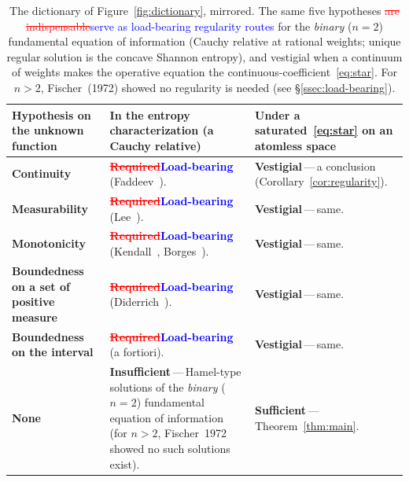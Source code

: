 \documentclass{article}
\newcommand{\ReviewAdd}[1]{\textcolor{blue}{#1}}
\newcommand{\ReviewDel}[1]{\textcolor{red}{\sout{#1}}}
\theoremstyle{plain}
\theoremstyle{definition}
\begin{document}
\begin{table}[ht]
\renewcommand{\arraystretch}{1.4}
\centering
\begin{tabularx}{\linewidth}{@{} >{\raggedright\arraybackslash}X
  >{\raggedright\arraybackslash}X
  >{\raggedright\arraybackslash}X @{}}
\toprule
\textbf{Hypothesis on the unknown function} &
\textbf{In the entropy characterization (a Cauchy relative)} &
\textbf{Under a saturated~\eqref{eq:star} on an atomless space} \\
\midrule
\textbf{Continuity}
  & \ReviewDel{\textbf{Required}}\ReviewAdd{\textbf{Load-bearing}} (Faddeev~\cite{Faddeev1957}).
  & \textbf{Vestigial}\,---\,a conclusion (Corollary~\ref{cor:regularity}). \\
\midrule
\textbf{Measurability}
  & \ReviewDel{\textbf{Required}}\ReviewAdd{\textbf{Load-bearing}} (Lee~\cite{Lee1964}).
  & \textbf{Vestigial}\,---\,same. \\
\midrule
\textbf{Monotonicity}
  & \ReviewDel{\textbf{Required}}\ReviewAdd{\textbf{Load-bearing}} (Kendall~\cite{Kendall1964}, Borges~\cite{Borges1967}).
  & \textbf{Vestigial}\,---\,same. \\
\midrule
\textbf{Boundedness on a set of positive measure}
  & \ReviewDel{\textbf{Required}}\ReviewAdd{\textbf{Load-bearing}} (Diderrich~\cite{Diderrich1975}).
  & \textbf{Vestigial}\,---\,same. \\
\midrule
\textbf{Boundedness on the interval}
  & \ReviewDel{\textbf{Required}}\ReviewAdd{\textbf{Load-bearing}} (a fortiori).
  & \textbf{Vestigial}\,---\,same. \\
\midrule
\textbf{None}
  & \textbf{Insufficient}\,---\,Hamel-type solutions of the \emph{binary} ($n{=}2$) fundamental equation of information~\cite{AczelDaroczy1975} (for $n{>}2$, Fischer~1972 showed no such solutions exist).
  & \textbf{Sufficient}\,---\,Theorem~\ref{thm:main}. \\
\bottomrule
\end{tabularx}
\caption{The dictionary of Figure~\ref{fig:dictionary}, mirrored. The
same five hypotheses \ReviewDel{are indispensable}\ReviewAdd{serve as load-bearing regularity routes} for the \emph{binary} ($n{=}2$)
fundamental equation of information (Cauchy relative at rational weights;
unique regular solution is the concave Shannon entropy), and vestigial
when a continuum of weights makes the operative equation the
continuous-coefficient~\eqref{eq:star}. For $n{>}2$, Fischer~(1972)
showed no regularity is needed (see \S\ref{ssec:load-bearing}).}
\label{tab:mirror}
\end{table}
\end{document}
